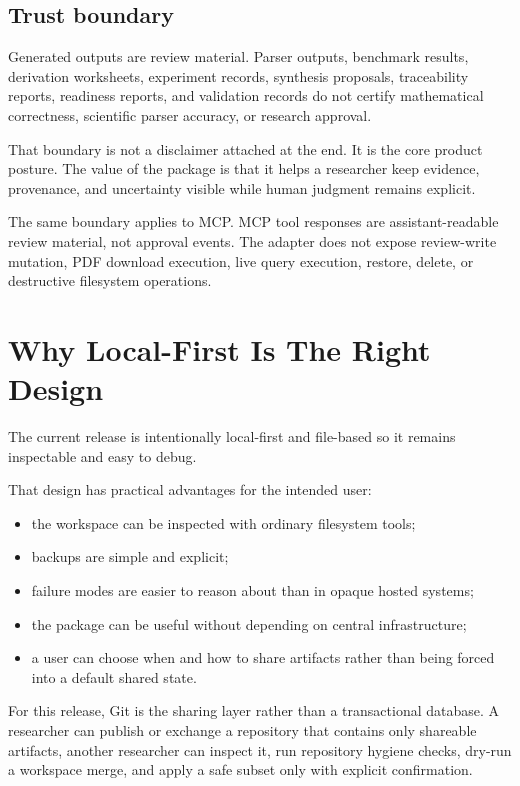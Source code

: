\documentclass[11pt,a4paper,openany]{book}
\begin{document}
\section{Trust boundary}

Generated outputs are review material. Parser outputs, benchmark results,
derivation worksheets, experiment records, synthesis proposals, traceability
reports, readiness reports, and validation records do not certify mathematical
correctness, scientific parser accuracy, or research approval.

That boundary is not a disclaimer attached at the end. It is the core product
posture. The value of the package is that it helps a researcher keep evidence,
provenance, and uncertainty visible while human judgment remains explicit.

The same boundary applies to MCP. MCP tool responses are assistant-readable
review material, not approval events. The adapter does not expose review-write
mutation, PDF download execution, live query execution, restore, delete, or
destructive filesystem operations.

\chapter{Why Local-First Is The Right Design}

The current release is intentionally local-first and file-based so it remains
inspectable and easy to debug.

That design has practical advantages for the intended user:
\begin{itemize}[nosep]
  \item the workspace can be inspected with ordinary filesystem tools;
  \item backups are simple and explicit;
  \item failure modes are easier to reason about than in opaque hosted systems;
  \item the package can be useful without depending on central infrastructure;
  \item a user can choose when and how to share artifacts rather than being
        forced into a default shared state.
\end{itemize}

For this release, Git is the sharing layer rather than a transactional database.
A researcher can publish or exchange a repository that contains only shareable
artifacts, another researcher can inspect it, run repository hygiene checks,
dry-run a workspace merge, and apply a safe subset only with explicit
confirmation.
\end{document}
